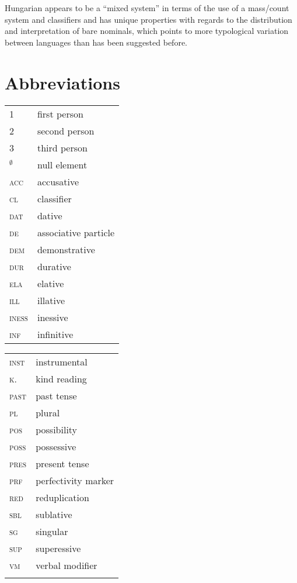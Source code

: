 \documentclass[output=paper]{langscibook}
\begin{document}
Hungarian appears to be a ``mixed system'' in terms of the use of a mass/count system and classifiers and has unique properties with regards to the distribution and interpretation of bare nominals, which points to more typological variation between languages than has been suggested before. 

%

\section*{Abbreviations}

\begin{tabularx}{.5\textwidth}{@{}lX@{}}
\textsc{1}&first person\\
\textsc{2}&second person\\
\textsc{3}&third person\\
\textsc{$_{\emptyset}$}&null element\\
\textsc{acc}&accusative\\
\textsc{cl}&classifier\\
\textsc{dat}&dative\\
\textsc{de}&associative particle\\
\textsc{dem}&demonstrative\\
\textsc{dur}&durative\\
\textsc{ela}&elative\\
\textsc{ill}&illative\\
\textsc{iness}&inessive\\
\textsc{inf}&infinitive\\
\end{tabularx}%
\begin{tabularx}{.5\textwidth}{@{}lX@{}}
\textsc{inst}&instrumental\\
\textsc{k.}&kind reading\\
\textsc{past}&{past tense}\\
\textsc{pl}&plural\\
\textsc{pos}&possibility\\
\textsc{poss}&possessive\\
\textsc{pres}&present tense\\
\textsc{prf}&perfectivity marker\\
\textsc{red}&reduplication\\
\textsc{sbl}&sublative\\
\textsc{sg}&singular\\
\textsc{sup}&superessive\\
\textsc{vm}&verbal modifier\\
{}&{}\\
\end{tabularx}
\end{document}

